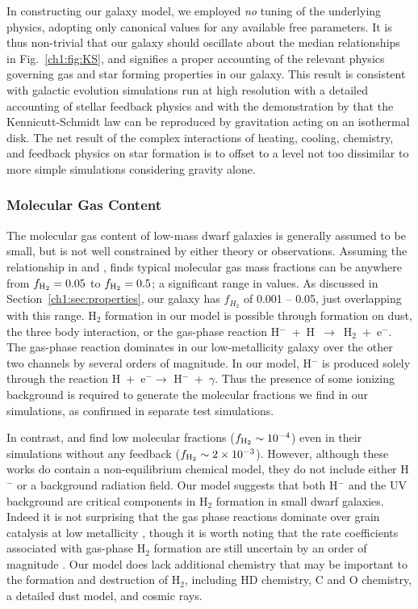 In constructing our galaxy model, we employed \textit{no} tuning of the underlying physics, adopting only canonical values for any available free parameters. It is thus non-trivial that our galaxy should oscillate about the median relationships in Fig.~\ref{ch1:fig:KS}, and signifies a proper accounting of the relevant physics governing gas and star forming properties in our galaxy. This result is consistent with galactic evolution simulations run at high resolution with a detailed accounting of stellar feedback physics \citep[see ][ and references therein]{NaabOstriker2017} and with the demonstration by \citet{Li2005} that the Kennicutt-Schmidt law can be reproduced by gravitation acting on an isothermal disk. The net result of the complex interactions of heating, cooling, chemistry, and feedback physics on star formation is to offset to a level not too dissimilar to more simple simulations considering gravity alone.

\subsubsection{Molecular Gas Content}
\label{ch1:sec:molecular gas content}
The molecular gas content of low-mass dwarf galaxies is generally assumed
to be small, but is not well constrained by either theory or observations. Assuming the relationship in \citet{Leroy2013} and \citet{Momose2013}, \citet{Roychowdhury2014} finds typical molecular gas mass fractions can be anywhere from $f_{\rm H_2} = 0.05$ to $f_{\rm H_2} = 0.5$; a significant range in values. As discussed in Section~\ref{ch1:sec:properties}, our galaxy has $f_{H_2}$ of 0.001 -- 0.05, just overlapping with this range. H$_2$ formation in our model is possible through formation on dust, the three body interaction, or the gas-phase reaction H$^-$~+~H~$\rightarrow$~H$_2$~+~e$^{-}$. The gas-phase reaction dominates in our low-metallicity galaxy over the other two channels by several orders of magnitude. In our model, H$^{-}$ is produced solely through the reaction H~+~e$^{-} \rightarrow$ H$^{-}$~+~$\gamma$. Thus the presence of some ionizing background is required to generate the molecular fractions we find in our simulations, as confirmed in separate test simulations.

In contrast, \citet{Hu2016} and \citet{Hu2017} find low molecular fractions ($f_{\rm H_2} \sim 10^{-4}$) even in their simulations without any feedback ($f_{\rm H_2} \sim 2 \times 10^{-3}$). However, although these works do contain a non-equilibrium chemical model, they do not include either H$^{-}$ or a background radiation field. Our model suggests that both H$^{-}$ and the UV background are critical components in H$_2$ formation in small dwarf galaxies. Indeed it is not surprising that the gas phase reactions dominate over grain catalysis at low metallicity \citep{Glover2003}, though it is worth noting that the rate coefficients associated with gas-phase H$_2$ formation are still uncertain by an order of magnitude \citep{Glover2006,Glover2007}. Our model does lack additional chemistry that may be important to the formation and destruction of H$_2$, including HD chemistry, C and O chemistry, a detailed dust model, and cosmic rays.

